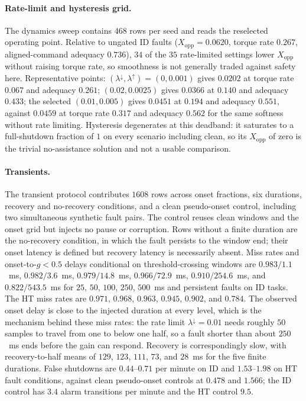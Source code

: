 \documentclass[letterpaper]{article}
\begin{document}
\paragraph{Rate-limit and hysteresis grid.}
The dynamics sweep contains $468$ rows per seed and reads the reselected
operating point. Relative to ungated ID faults ($X_{\mathrm{opp}}=0.0620$,
torque rate $0.267$, aligned-command adequacy $0.736$), $34$ of the $35$
rate-limited settings lower $X_{\mathrm{opp}}$ without raising torque rate,
so smoothness is not generally traded against safety here. Representative
points: $(\lambda^{\downarrow},\lambda^{\uparrow})=(0,0.001)$ gives $0.0202$ at
torque rate $0.067$ and adequacy $0.261$; $(0.02,0.0025)$ gives $0.0366$ at
$0.140$ and adequacy $0.433$; the selected $(0.01,0.005)$ gives $0.0451$ at
$0.194$ and adequacy $0.551$, against $0.0459$ at torque rate $0.317$ and
adequacy $0.562$ for the same softness without rate limiting. Hysteresis
degenerates at this deadband: it saturates to a full-shutdown fraction of $1$ on
every scenario including clean, so its $X_{\mathrm{opp}}$ of zero is the trivial
no-assistance solution and not a usable comparison.

\paragraph{Transients.}
The transient protocol contributes $1608$ rows across onset fractions, six
durations, recovery and no-recovery conditions, and a clean pseudo-onset
control, including two simultaneous synthetic fault pairs. The control reuses
clean windows and the onset grid but injects no pause or corruption. Rows without a
finite duration are the no-recovery condition, in which
the fault persists to the window end; their onset latency is defined but
recovery latency is necessarily absent. Miss rates and onset-to-$g<0.5$ delays
conditional on threshold-crossing windows are $0.983/1.1$~ms, $0.982/3.6$~ms,
$0.979/14.8$~ms, $0.966/72.9$~ms, $0.910/254.6$~ms, and $0.822/543.5$~ms for
$25$, $50$, $100$, $250$, $500$~ms and persistent faults on ID tasks. The HT
miss rates are $0.971$, $0.968$, $0.963$, $0.945$, $0.902$, and $0.784$. The
observed onset delay is close to the injected duration at every level, which is
the mechanism behind these miss rates: the rate limit $\lambda^{\downarrow}=0.01$
needs roughly $50$ samples to travel from one to below one half, so a fault
shorter than about $250$~ms ends before the gain can respond. Recovery is
correspondingly slow, with recovery-to-half means of $129$, $123$, $111$, $73$,
and $28$~ms for the five finite durations. False shutdowns are
$0.44$--$0.71$ per minute on ID and $1.53$--$1.98$ on HT fault conditions,
against clean pseudo-onset controls at $0.478$ and $1.566$; the ID control has
$3.4$ alarm transitions per minute and the HT control $9.5$.
\end{document}
